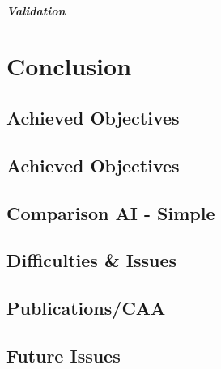 \documentclass{report}
\begin{document}
			\paragraph{Validation}


\newpage 
\chapter{Conclusion}
      \section{Achieved Objectives}
      \section{Achieved Objectives}
      \section{Comparison AI - Simple}
      \section{Difficulties \& Issues}
      \section{Publications/CAA}
      \section{Future Issues}
\newpage 
\end{document}
